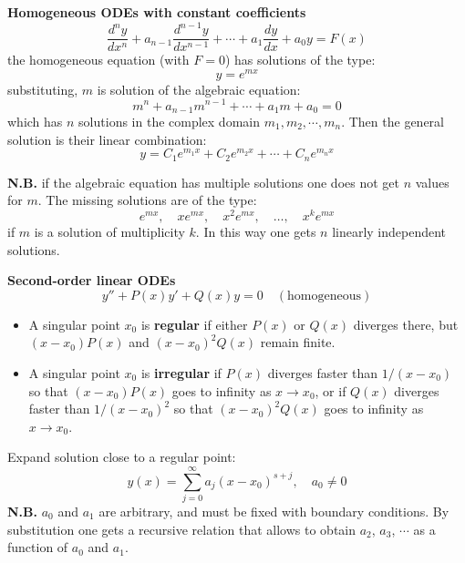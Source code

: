 \documentclass{article}
\begin{document}
\vspace{2mm}\noindent
\textbf{Homogeneous ODEs with constant coefficients}
\begin{equation}
    \frac{d^n y}{dx^n} + a_{n-1} \frac{d^{n-1} y}{dx^{n-1}} + \cdots + a_1 \frac{dy}{dx} + a_0 y = F(x)
\end{equation}
the homogeneous equation (with $F=0$) has solutions of the type:
\begin{equation}
    y=e^{mx}
\end{equation}
substituting, $m$ is solution of the algebraic equation:
\begin{equation}
    m^n + a_{n-1} m^{n-1} + \cdots + a_1 m + a_0 = 0
\end{equation}
which has $n$ solutions in the complex domain $m_1, m_2, \cdots , m_n$. Then the general solution is their linear combination:
\begin{equation}
    y = C_1 e^{m_1 x} + C_2 e^{m_2 x} + \cdots + C_n e^{m_n x}
\end{equation}

\noindent
\textbf{N.B.} if the algebraic equation has multiple solutions one does not get $n$ values for $m$. The missing solutions are of the type:
\begin{equation}
    e^{mx}, \quad x e^{mx}, \quad x^2 e^{mx}, \quad \ldots, \quad x^k e^{mx}
\end{equation}
if $m$ is a solution of multiplicity $k$. In this way one gets $n$ linearly independent solutions. 

\vspace{2mm}\noindent
\textbf{Second-order linear ODEs}
\begin{equation}
    y'' + P(x)y' + Q(x)y = 0 \quad (\text{homogeneous})
\end{equation}
\begin{itemize}
    \item A singular point $x_0$ is \textbf{regular} if either $P(x)$ or $Q(x)$ diverges there, but $(x - x_0) P(x)$ and $(x - x_0)^2 Q(x)$ remain finite.
    \item A singular point $x_0$ is \textbf{irregular} if $P(x)$ diverges faster than $1/(x - x_0)$ so that $(x - x_0) P(x)$ goes to infinity as $x \to x_0$, or if $Q(x)$ diverges faster than $1/(x - x_0)^2$ so that $(x - x_0)^2 Q(x)$ goes to infinity as $x \to x_0$.
\end{itemize}
\newpage

\noindent
Expand solution close to a regular point:
\begin{equation}
    y(x) = \sum_{j=0}^{\infty} a_j (x - x_0)^{s + j}, \quad a_0 \ne 0
\end{equation}
\textbf{N.B. } $a_0$ and $a_1$ are arbitrary, and must be fixed with boundary conditions. By substitution one gets a recursive relation that allows to obtain $a_2$, $a_3$, $\cdots$ as a function of $a_0$ and $a_1$.
\end{document}
